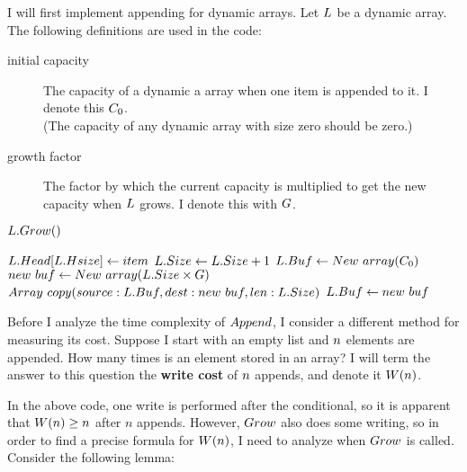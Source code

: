 \HdrDynArrayImpl

I will first implement appending for dynamic arrays. Let $L$ be a dynamic array. The following definitions are used in the code:

\begin{description}
	\item[initial capacity] The capacity of a dynamic a array when one item is appended to it. I denote this $C_0$.\\
	(The capacity of any dynamic array with size zero should be zero.)
	\item[growth factor] The factor by which the current capacity is multiplied to get the new capacity when $L$ grows. I denote this with $G$.
\end{description}

\begin{algorithm}
	\begin{algorithmic}[1]
				\State $L.Grow()$
			\EndIf
			
			\State $L.Head[L.Hsize] \gets item$
			\State $L.Size \gets L.Size + 1$
		\EndProcedure
		\Statex
				\State $L.Buf \gets New\ array(C_0)$
			\Else
				\State $new\ buf \gets New\ array(L.Size \times G)$
				\State $Array\ copy(source: L.Buf, dest: new\ buf, len: L.Size)$
				\State $L.Buf \gets new\ buf$
			\EndIf
		\EndProcedure
	\end{algorithmic}
\end{algorithm}

\HdrTimeComplex

Before I analyze the time complexity of $Append$, I consider a different method for measuring its cost. Suppose I start with an empty list and $n$ elements are appended. How many times is an element stored in an array? I will term the answer to this question the \textbf{write cost} of $n$ appends, and denote it $W(n)$.

In the above code, one write is performed after the conditional, so it is apparent that $W(n) \geq n$ after $n$ appends. However, $Grow$ also does some writing, so in order to find a precise formula for $W(n)$, I need to analyze when $Grow$ is called. Consider the following lemma:

